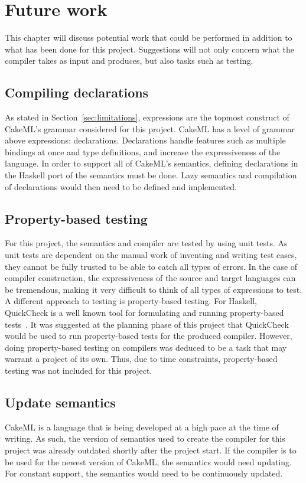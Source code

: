 \chapter{Future work}

This chapter will discuss potential work that could be performed in
addition to what has been done for this project. Suggestions will not only
concern what the compiler takes as input and produces, but also tasks such as
testing.

\section{Compiling declarations}
As stated in Section~\ref{sec:limitations}, expressions are the topmost
construct of CakeML's grammar considered for this project. CakeML has a level
of grammar above expressions: declarations. Declarations handle
features such as multiple
bindings at once and type definitions, and increase the expressiveness of the
language. In order to support all of CakeML's semantics, defining declarations
in the Haskell port of the semantics must be done. Lazy semantics and
compilation of declarations would then need to be defined and implemented.

\section{Property-based testing}
For this project, the semantics and compiler are tested by using unit tests.
As unit tests are dependent on the manual work of inventing and writing
test cases, they cannot be fully trusted to be able to catch all types of
errors. In the case of compiler construction, the expressiveness of the
source and target languages can be tremendous, making it very difficult to
think of all types of expressions to test. A different approach to testing
is property-based testing. For Haskell, QuickCheck is a well known tool for
formulating and running property-based
tests~\cite{Claessen:2000:QLT:351240.351266}.
It was suggested at the planning phase of this project that QuickCheck would
be used to run property-based tests for the produced compiler. However, doing
property-based testing on compilers was deduced to be a task that may warrant
a project of its own. Thus, due to time constraints, property-based testing
was not included for this project.

\section{Update semantics}
CakeML is a language that is being developed at a high pace at the time of
writing. As such, the version of semantics used to create the compiler for this
project was already outdated shortly after the project start. If the compiler
is to be used for the newest version of CakeML, the semantics would need
updating. For constant support, the semantics would need to be continuously
updated.

